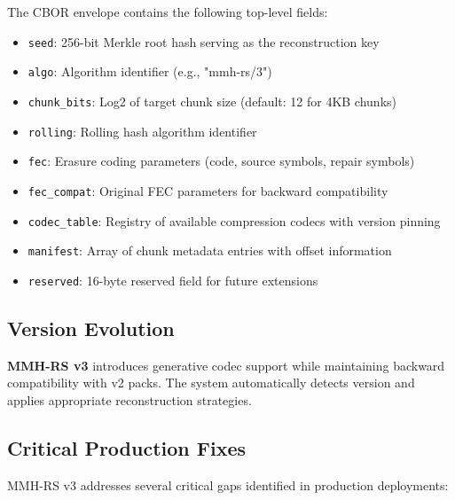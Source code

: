 \documentclass[11pt,a4paper]{article}
\begin{document}
	The CBOR envelope contains the following top-level fields:
	\begin{itemize}
		\item \texttt{seed}: 256-bit Merkle root hash serving as the reconstruction key
		\item \texttt{algo}: Algorithm identifier (e.g., "mmh-rs/3")
		\item \texttt{chunk\_bits}: Log2 of target chunk size (default: 12 for 4KB chunks)
		\item \texttt{rolling}: Rolling hash algorithm identifier
		\item \texttt{fec}: Erasure coding parameters (code, source symbols, repair symbols)
		\item \texttt{fec\_compat}: Original FEC parameters for backward compatibility
		\item \texttt{codec\_table}: Registry of available compression codecs with version pinning
		\item \texttt{manifest}: Array of chunk metadata entries with offset information
		\item \texttt{reserved}: 16-byte reserved field for future extensions
	\end{itemize}
	
	\subsection{Version Evolution}
	
	\begin{calloutbox}
	\textbf{MMH-RS v3} introduces generative codec support while maintaining backward compatibility with v2 packs. The system automatically detects version and applies appropriate reconstruction strategies.
	\end{calloutbox}
	
	\subsection{Critical Production Fixes}
	
	MMH-RS v3 addresses several critical gaps identified in production deployments:
	
\end{document}
